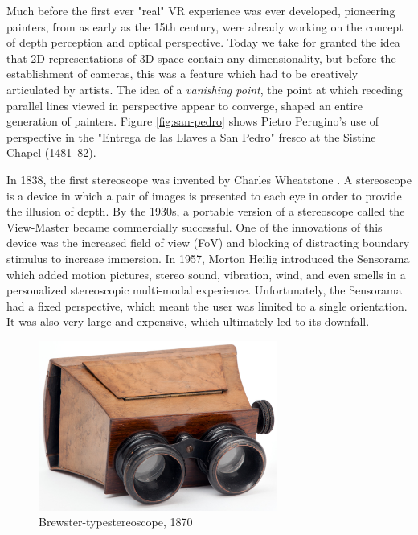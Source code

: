 Much before the first ever "real" VR experience was ever developed, pioneering painters, from as early as the 15th century, were already working on the concept of depth perception and optical perspective. Today we take for granted the idea that 2D representations of 3D space contain any dimensionality, but before the establishment of cameras, this was a feature which had to be creatively articulated by artists. The idea of a \textit{vanishing point}, the point at which receding parallel lines viewed in perspective appear to converge, shaped an entire generation of painters. Figure \ref{fig:san-pedro} shows Pietro Perugino's use of perspective in the "Entrega de las Llaves a San Pedro" fresco at the Sistine Chapel (1481–82).

In 1838, the first stereoscope was invented by Charles Wheatstone \cite{hemstrom2020comparison}. A stereoscope is a device in which a pair of images is presented to each eye in order to provide the illusion of depth. By the 1930s, a portable version of a stereoscope called the View-Master became commercially successful. One of the innovations of this device was the increased field of view (FoV) and blocking of distracting boundary stimulus to increase immersion. In 1957, Morton Heilig introduced the Sensorama which added motion pictures, stereo sound, vibration, wind, and even smells in a personalized stereoscopic multi-modal experience. Unfortunately, the Sensorama had a fixed perspective, which meant the user was limited to a single orientation. It was also very large and expensive, which ultimately led to its downfall.

\begin{figure}[ht!]%
\centering
\includegraphics[width=0.7\textwidth]{img/stereoscope.jpg} 
\caption{Brewster-type\protect\footnotemark stereoscope, 1870 \cite{FileIGB032online}}
\end{figure}


